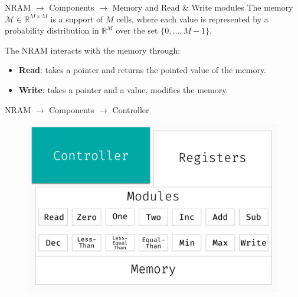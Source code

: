 \documentclass[xcolor={usenames}]{beamer}
\begin{document}
  \begin{frame}{NRAM \(\rightarrow\) Components \(\rightarrow\)  Memory and Read \& Write modules}
  	The memory $\mathcal{M} \in \mathbb{R}^{M \times M}$ is a support of $M$ cells, where each value is represented by a probability distribution in $\mathbb{R}^M$ over the set $\{0,\dots,M-1\}$.
  	
  	
  	The NRAM interacts with the memory through:
  	\begin{itemize}

		\item{\textbf{Read}: takes a pointer and returns the pointed value of the memory.}
		\item{\textbf{Write}: takes a pointer and a value, modifies the memory.}
  	\end{itemize}
  \end{frame}
  \begin{frame}{NRAM \(\rightarrow\) Components \(\rightarrow\)  Controller}
  	\begin{figure}
  		\centering
  		\includegraphics[width=\textwidth]{../figures/schema-nram-with-memory-CONTROLLER.png}
  	\end{figure}
  \end{frame}
\end{document}
